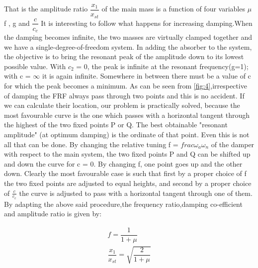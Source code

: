 That is the amplitude ratio $\dfrac{x_1}{x_{st}}$ of the main mass is a function of four variables $\mu$  f , g and  $\dfrac{c}{c_c} $
It is interesting to follow what happens for increasing damping.When the damping becomes infinite, the two masses are virtually clamped together and we have a single-degree-of-freedom system.
In adding the absorber to the system, the objective is to bring the resonant peak of the amplitude down to its lowest possible value. With $c_2$ = 0, the peak is infinite at the resonant frequency(g=1); with c = $\infty$ it is again infinite. Somewhere in between there must be a value of c for which the peak becomes a minimum.
As can be seen from \ref{fig:4},irrespective of damping the FRF always pass through two points and this is no accident. If we can calculate their location, our problem is practically solved, because the most favourable curve is the one which passes with a horizontal tangent through the highest of the two fixed points P or Q. The best obtainable "resonant amplitude" (at optimum damping) is the ordinate of that point.
Even this is not all that can be done. By changing the relative tuning f = $frac{\omega_a}{\omega_n}$ of the damper with respect to the main system, the two fixed points P and Q can be shifted up and down
the curve for c = 0. By changing f, one point goes up and the other down. Clearly the most favourable case is such that first by a proper choice of f the two fixed points are adjusted to equal heights, and second by a proper choice of $\frac{c}{c_c}$ the curve is adjusted
to pass with a horizontal tangent through one of them.
By adapting the above said procedure,the frequency ratio,damping co-efficient and amplitude ratio is given by:

\begin{align}
f = \dfrac{1}{1+\mu}\\
\dfrac{x_1}{x_{st}}= \sqrt{\dfrac{2}{1+\mu}}
\end{align}

